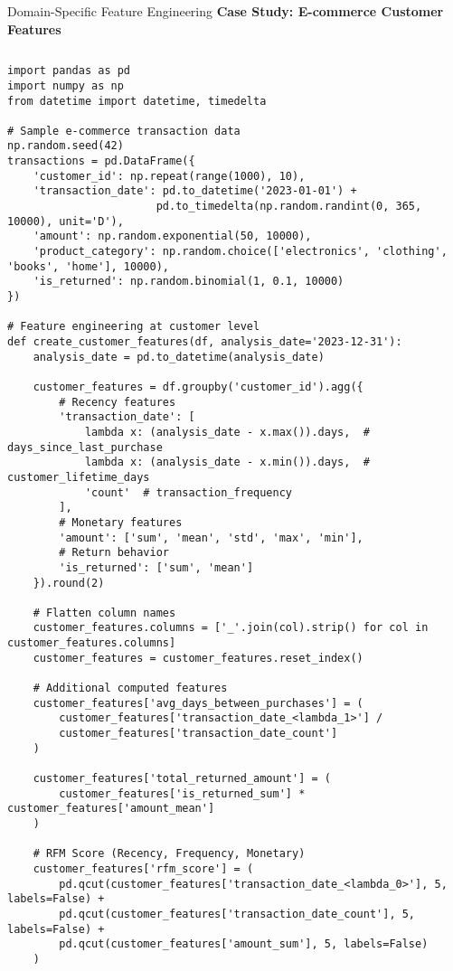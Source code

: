 \documentclass[aspectratio=169,11pt]{beamer}
\begin{document}
\begin{frame}[fragile]{Domain-Specific Feature Engineering}
\textbf{Case Study: E-commerce Customer Features}

\begin{columns}
\begin{column}{0.55\textwidth}
\begin{lstlisting}
import pandas as pd
import numpy as np
from datetime import datetime, timedelta

# Sample e-commerce transaction data
np.random.seed(42)
transactions = pd.DataFrame({
    'customer_id': np.repeat(range(1000), 10),
    'transaction_date': pd.to_datetime('2023-01-01') + 
                       pd.to_timedelta(np.random.randint(0, 365, 10000), unit='D'),
    'amount': np.random.exponential(50, 10000),
    'product_category': np.random.choice(['electronics', 'clothing', 'books', 'home'], 10000),
    'is_returned': np.random.binomial(1, 0.1, 10000)
})

# Feature engineering at customer level
def create_customer_features(df, analysis_date='2023-12-31'):
    analysis_date = pd.to_datetime(analysis_date)
    
    customer_features = df.groupby('customer_id').agg({
        # Recency features
        'transaction_date': [
            lambda x: (analysis_date - x.max()).days,  # days_since_last_purchase
            lambda x: (analysis_date - x.min()).days,  # customer_lifetime_days
            'count'  # transaction_frequency
        ],
        # Monetary features
        'amount': ['sum', 'mean', 'std', 'max', 'min'],
        # Return behavior
        'is_returned': ['sum', 'mean']
    }).round(2)
    
    # Flatten column names
    customer_features.columns = ['_'.join(col).strip() for col in customer_features.columns]
    customer_features = customer_features.reset_index()
    
    # Additional computed features
    customer_features['avg_days_between_purchases'] = (
        customer_features['transaction_date_<lambda_1>'] / 
        customer_features['transaction_date_count']
    )
    
    customer_features['total_returned_amount'] = (
        customer_features['is_returned_sum'] * customer_features['amount_mean']
    )
    
    # RFM Score (Recency, Frequency, Monetary)
    customer_features['rfm_score'] = (
        pd.qcut(customer_features['transaction_date_<lambda_0>'], 5, labels=False) +
        pd.qcut(customer_features['transaction_date_count'], 5, labels=False) +
        pd.qcut(customer_features['amount_sum'], 5, labels=False)
    )
    

\end{lstlisting}
\end{column}
\end{columns}
\end{frame}
\end{document}
